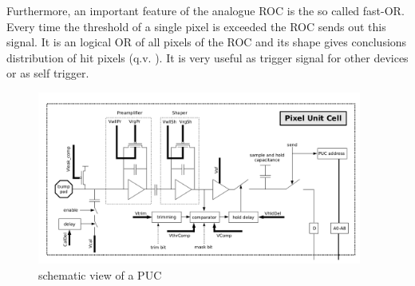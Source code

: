 \documentclass[british,11pt,a4paper]{memoir}
\begin{document}
Furthermore, an important feature of the analogue \ac{ROC} is the so called fast-OR. Every time the threshold of a single pixel is exceeded the \ac{ROC} sends out this signal. It is an logical OR of all pixels of the \ac{ROC} and its shape gives conclusions distribution of hit pixels (q.v. ). It is very useful as trigger signal for other devices or as self trigger.
\begin{figure}[ht]
	\includegraphics[width=0.95\textwidth]{PUC}
	\caption{schematic view of a \ac{PUC} \cite{dambach}}
	\label{p9}
\end{figure}
\end{document}
